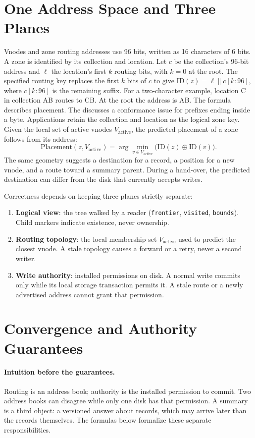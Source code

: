 \documentclass[11pt]{article}
\begin{document}
\section{One Address Space and Three Planes}
Vnodes and zone routing addresses use 96 bits, written as 16 characters of 6 bits. A zone is identified by its collection and location. Let $c$ be the collection's 96-bit address and $\ell$ the location's first $k$ routing bits, with $k=0$ at the root. The specified routing key replaces the first $k$ bits of $c$ to give $\mathrm{ID}(z)=\ell\parallel c[k:96]$, where $c[k:96]$ is the remaining suffix. For a two-character example, location C in collection AB routes to CB. At the root the address is AB. The formula describes placement. The  discusses a conformance issue for prefixes ending inside a byte. Applications retain the collection and location as the logical zone key. Given the local set of active vnodes $V_{\mathrm{active}}$, the predicted placement of a zone follows from its address:
\[
\mathrm{Placement}(z, V_{\mathrm{active}}) = \arg\min_{v \in V_{\mathrm{active}}} \bigl(\mathrm{ID}(z) \oplus \mathrm{ID}(v)\bigr).
\]
The same geometry suggests a destination for a record, a position for a new vnode, and a route toward a summary parent. During a hand-over, the predicted destination can differ from the disk that currently accepts writes.

Correctness depends on keeping three planes strictly separate:
\begin{enumerate}[leftmargin=1.5em,itemsep=1pt]
  \item \textbf{Logical view}: the tree walked by a reader (\texttt{frontier}, \texttt{visited}, \texttt{bounds}). Child markers indicate existence, never ownership.
  \item \textbf{Routing topology}: the local membership set $V_{\mathrm{active}}$ used to predict the closest vnode. A stale topology causes a forward or a retry, never a second writer.
  \item \textbf{Write authority}: installed permissions on disk. A normal write commits only while its local storage transaction permits it. A stale route or a newly advertised address cannot grant that permission.
\end{enumerate}

\section{Convergence and Authority Guarantees}\hypertarget{ix:authority}{}
\paragraph{Intuition before the guarantees.}
Routing is an address book; authority is the installed permission to commit. Two address books can disagree while only one disk has that permission. A summary is a third object: a versioned answer about records, which may arrive later than the records themselves. The formulas below formalize these separate responsibilities.
\end{document}
